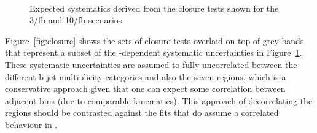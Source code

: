 \begin{figure}[]
  \centering
   ~~
  \caption{\label{fig:systematics} Expected systematics derived from the closure tests shown for
the 3/fb and 10/fb scenarios}
\end{figure}

Figure~\ref{fig:closure} shows the sets of closure tests overlaid on
top of grey bands that represent a subset of the \scalht-dependent systematic
uncertainties in Figure~\ref{fig:systematics}. These systematic
uncertainties are assumed to fully uncorrelated between the different
b jet multiplicity categories and also the seven \scalht regions,
which is a conservative approach given that one can expect some
correlation between adjacent \scalht bins (due to comparable
kinematics). This approach of decorrelating the \scalht regions
should be contrasted against the fits that do assume a correlated 
behaviour in \scalht.

